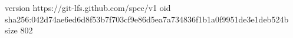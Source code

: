 version https://git-lfs.github.com/spec/v1
oid sha256:042d74ae6ed6d8f53b7f703cf9e86d5ea7a734836f1b1a0f9951de3e1deb524b
size 802

